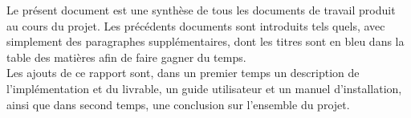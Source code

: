Le présent document est une synthèse de tous les documents de travail produit au cours du projet. Les précédents documents sont introduits tels quels, avec simplement des paragraphes supplémentaires, dont les titres sont en bleu dans la table des matières afin de faire gagner du temps.\\

Les ajouts de ce rapport sont, dans un premier temps un description de l'implémentation et du livrable, un guide utilisateur et un manuel d'installation, ainsi que dans second temps, une conclusion sur l'ensemble du projet.
